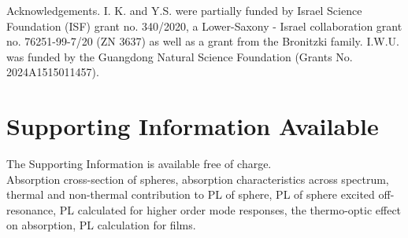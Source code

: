 \documentclass[10pt]{article}
\begin{document}
Acknowledgements. I. K. and Y.S. were partially funded by Israel Science Foundation (ISF) grant no. 340/2020, a Lower-Saxony - Israel collaboration grant no. 76251-99-7/20 (ZN 3637) as well as a grant from the Bronitzki family. I.W.U. was funded by the Guangdong Natural Science Foundation (Grants No. 2024A1515011457).

\section*{Supporting Information Available}
The Supporting Information is available free of charge.\\
Absorption cross-section of spheres, absorption characteristics across spectrum, thermal and non-thermal contribution to PL of sphere, PL of sphere excited off-resonance, PL calculated for higher order mode responses, the thermo-optic effect on absorption, PL calculation for films.
\end{document}
